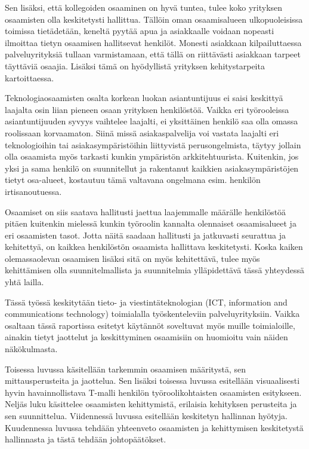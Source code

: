 \documentclass[a4paper,finnish,12pt]{article}
\begin{document}
Sen lisäksi, että kollegoiden osaaminen on hyvä tuntea, tulee koko yrityksen osaamisten olla keskitetysti hallittua. Tällöin oman osaamisalueen ulkopuoleisissa toimissa tietädetään, keneltä pyytää apua ja asiakkaalle voidaan nopeasti ilmoittaa tietyn osaamisen hallitsevat henkilöt. Monesti asiakkaan kilpailuttaessa palveluyrityksiä tullaan varmistamaan, että tällä on riittävästi asiakkaan tarpeet täyttäviä osaajia. Lisäksi tämä on hyödyllistä yrityksen kehitystarpeita kartoittaessa.

Teknologiaosaamisten osalta korkean luokan asiantuntijuus ei saisi keskittyä laajalta osin liian pieneen osaan yrityksen henkilöstöä. Vaikka eri työrooleissa asiantuntijuuden syvyys vaihtelee laajalti, ei yksittäinen henkilö saa olla omassa roolissaan korvaamaton. Siinä missä asiakaspalvelija voi vastata laajalti eri teknologioihin tai asiakasympäristöihin liittyvistä perusongelmista, täytyy jollain olla osaamista myös tarkasti kunkin ympäristön arkkitehtuurista. Kuitenkin, jos yksi ja sama henkilö on suunnitellut ja rakentanut kaikkien asiakasympäristöjen tietyt osa-alueet, kostautuu tämä valtavana ongelmana esim. henkilön irtisanoutuessa.

Osaamiset on siis saatava hallitusti jaettua laajemmalle määrälle henkilöstöä pitäen kuitenkin mielessä kunkin työroolin kannalta olennaiset osaamisalueet ja eri osaamisten tasot. Jotta näitä saadaan hallitusti ja jatkuvasti seurattua ja kehitettyä, on kaikkea henkilöstön osaamista hallittava keskitetysti. Koska kaiken olemassaolevan osaamisen lisäksi sitä on myös kehitettävä, tulee myös kehittämisen olla suunnitelmallista ja suunnitelmia ylläpidettävä tässä yhteydessä yhtä lailla.

Tässä työssä keskitytään tieto- ja viestintäteknologian (ICT, information and communications technology) toimialalla työskenteleviin palveluyrityksiin. Vaikka osaltaan tässä raportissa esitetyt käytännöt soveltuvat myös muille toimialoille, ainakin tietyt jaottelut ja keskittyminen osaamisiin on huomioitu vain näiden näkökulmasta.

Toisessa luvussa käsitellään tarkemmin osaamisen määritystä, sen mittausperusteita ja jaottelua. Sen lisäksi toisessa luvussa esitellään visuaalisesti hyvin havainnollistava T-malli henkilön työroolikohtaisten osaamisten esitykseen. Neljäs luku käsittelee osaamisten kehittymistä, erilaisia kehityksen perusteita ja sen suunnittelua. Viidennessä luvussa esitellään keskitetyn hallinnan hyötyja. Kuudennessa luvussa tehdään yhteenveto osaamisten ja kehittymisen keskitetystä hallinnasta ja tästä tehdään johtopäätökset.
\end{document}
